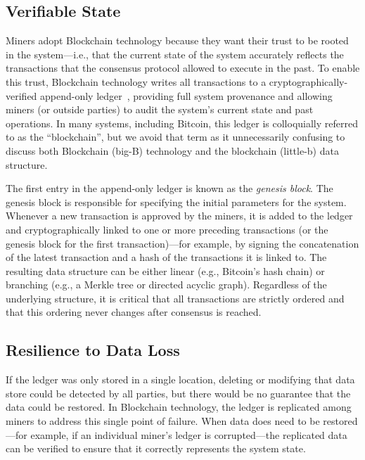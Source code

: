 \subsection{Verifiable State}
Miners adopt Blockchain technology because they want their trust to be rooted in the system---i.e., that the current state of the system accurately reflects the transactions that the consensus protocol allowed to execute in the past.
To enable this trust, Blockchain technology writes all transactions to a cryptographically-verified append-only ledger~\cite{tamassia2003authenticated}, providing full system provenance and allowing miners (or outside parties) to audit the system's current state and past operations.
In many systems, including Bitcoin, this ledger is colloquially referred to as the ``blockchain'', but we avoid that term as it unnecessarily confusing to discuss both Blockchain (big-B) technology and the blockchain (little-b) data structure.

The first entry in the append-only ledger is known as the \emph{genesis block}.
The genesis block is responsible for specifying the initial parameters for the system.
Whenever a new transaction is approved by the miners, it is added to the ledger and cryptographically linked to one or more preceding transactions (or the genesis block for the first transaction)---for example, by signing the concatenation of the latest transaction and a hash of the transactions it is linked to.
The resulting data structure can be either linear (e.g., Bitcoin's hash chain) or branching (e.g., a Merkle tree or directed acyclic graph).
Regardless of the underlying structure, it is critical that all transactions are strictly ordered and that this ordering never changes after consensus is reached.


\subsection{Resilience to Data Loss}
If the ledger was only stored in a single location, deleting or modifying that data store could be detected by all parties, but there would be no guarantee that the data could be restored.
In Blockchain technology, the ledger is replicated among miners to address this single point of failure.
When data does need to be restored---for example, if an individual miner's 
ledger is corrupted---the replicated data can be verified to ensure that it 
correctly represents the system state.

